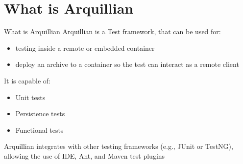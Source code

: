 \section[Introduction]{What is Arquillian}
\begin{frame}{What is Arquillian}
	Arquillian is a Test framework, that can be used for:
	 \begin{itemize}
	 	\item testing inside a remote or embedded container
	 	\item deploy an archive to a container so the test can interact as a remote client
	 \end{itemize}
	 
	 It is capable of:
	 \begin{itemize}
	 	\item Unit tests
	 	\item Persistence tests
	 	\item Functional tests
	 \end{itemize}
	 
	 Arquillian integrates with other testing frameworks (e.g., JUnit or TestNG), allowing the use of IDE, Ant, and Maven test plugins
\end{frame}


